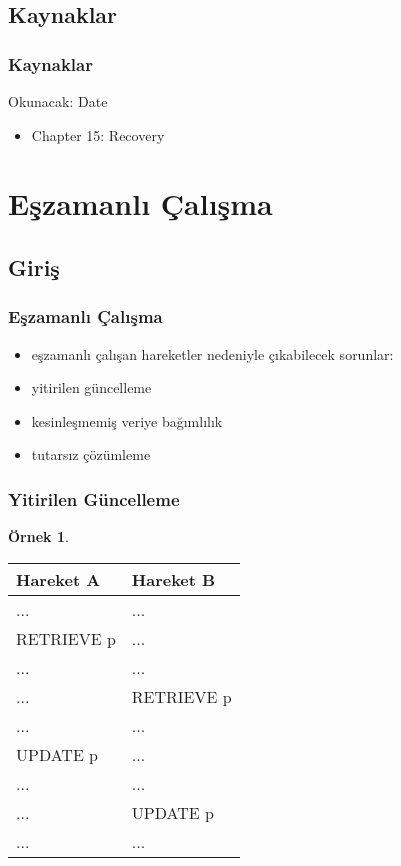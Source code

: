 \documentclass[dvipsnames]{beamer}
\theoremstyle{definition}
\theoremstyle{example}
\newtheorem{ornek}[theorem]{Örnek}
\theoremstyle{plain}
\begin{document}
\subsection*{Kaynaklar}

\begin{frame}
  \frametitle{Kaynaklar}

  \begin{block}{Okunacak: Date}
    \begin{itemize}
      \item Chapter 15: \alert{Recovery}
    \end{itemize}
  \end{block}
\end{frame}

\section{Eşzamanlı Çalışma}

\subsection{Giriş}

\begin{frame}
  \frametitle{Eşzamanlı Çalışma}

  \begin{itemize}
    \item eşzamanlı çalışan hareketler nedeniyle çıkabilecek sorunlar:

    \bigskip
    \item yitirilen güncelleme
    \item kesinleşmemiş veriye bağımlılık
    \item tutarsız çözümleme
  \end{itemize}
\end{frame}

\begin{frame}[fragile]
  \frametitle{Yitirilen Güncelleme}

  \begin{ornek}
    \begin{table}
      \begin{tabular}{ll}
Hareket A  & Hareket B \\\hline
...        & ...       \\\pause
RETRIEVE p & ...       \\\pause
...        & ...       \\
...        & RETRIEVE p\\\pause
...        & ...       \\
UPDATE p   & ...       \\\pause
...        & ...       \\
...        & UPDATE p  \\
...        & ...
      \end{tabular}
    \end{table}
  \end{ornek}
\end{frame}
\end{document}
